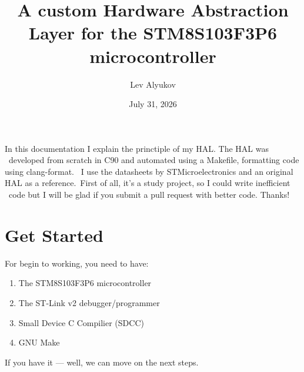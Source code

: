 \documentclass[12pt, a4paper]{article}
\title{A custom Hardware Abstraction Layer for the STM8S103F3P6 microcontroller}
\author{Lev Alyukov}
\date{July 31, 2026}
\begin{document}
\maketitle 

In this documentation I explain the princtiple of my HAL. The HAL was \
developed from scratch in C90 and automated using a Makefile, formatting code using clang-format. \
I use the datasheets by STMicroelectronics and an original HAL as a reference.\
First of all, it's a study project, so I could write inefficient \
code but I will be glad if you submit a pull request with better code. Thanks!

\section{Get Started}

For begin to working, you need to have:

\begin{enumerate}
\item The STM8S103F3P6 microcontroller
\item The ST-Link v2 debugger/programmer
\item Small Device C Compilier (SDCC)
\item GNU Make
\end{enumerate}

If you have it --- well, we can move on the next steps.
\end{document}
